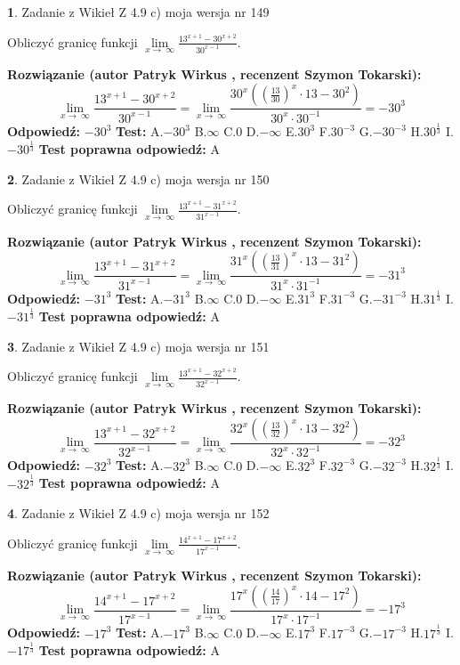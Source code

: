 \documentclass[12pt, a4paper]{article}
\theoremstyle{definition} %
\newtheorem{zad}{}
\newcommand{\zadStart}[1]{\begin{zad}#1\newline}
\newcommand{\zadStop}{\end{zad}}
\newcommand{\rozwStart}[2]{\noindent \textbf{Rozwiązanie (autor #1 , recenzent #2): }\newline}
\newcommand{\rozwStop}{\newline}
\newcommand{\odpStart}{\noindent \textbf{Odpowiedź:}\newline}
\newcommand{\odpStop}{\newline}
\newcommand{\testStart}{\noindent \textbf{Test:}\newline}
\newcommand{\testStop}{\newline}
\newcommand{\kluczStart}{\noindent \textbf{Test poprawna odpowiedź:}\newline}
\newcommand{\kluczStop}{\newline}
\begin{document}
\zadStart{Zadanie z Wikieł Z 4.9 c) moja wersja nr 149}


Obliczyć granicę funkcji  $\lim\limits_{x\to\ \infty}\frac{13^{x+1}-30^{x+2}}{30^{x-1}}$.
\zadStop
\rozwStart{Patryk Wirkus}{Szymon Tokarski}
$$\lim\limits_{x\to\ \infty}\frac{13^{x+1}-30^{x+2}}{30^{x-1}}=\lim\limits_{x\to\ \infty}\frac{30^{x}((\frac{13}{30})^{x}\cdot 13 -30^{2})}{30^{x}\cdot 30^{-1}} = -30^{3}$$
\rozwStop
\odpStart
$-30^{3}$
\odpStop
\testStart
A.$-30^{3}$ B.$\infty$ C.$0$ D.$-\infty$ E.$30^{3}$
F.$30^{-3}$ G.$-30^{-3}$
H.$30^{\frac{1}{3}}$
I.$-30^{\frac{1}{3}}$
\testStop
\kluczStart
A
\kluczStop



\zadStart{Zadanie z Wikieł Z 4.9 c) moja wersja nr 150}


Obliczyć granicę funkcji  $\lim\limits_{x\to\ \infty}\frac{13^{x+1}-31^{x+2}}{31^{x-1}}$.
\zadStop
\rozwStart{Patryk Wirkus}{Szymon Tokarski}
$$\lim\limits_{x\to\ \infty}\frac{13^{x+1}-31^{x+2}}{31^{x-1}}=\lim\limits_{x\to\ \infty}\frac{31^{x}((\frac{13}{31})^{x}\cdot 13 -31^{2})}{31^{x}\cdot 31^{-1}} = -31^{3}$$
\rozwStop
\odpStart
$-31^{3}$
\odpStop
\testStart
A.$-31^{3}$ B.$\infty$ C.$0$ D.$-\infty$ E.$31^{3}$
F.$31^{-3}$ G.$-31^{-3}$
H.$31^{\frac{1}{3}}$
I.$-31^{\frac{1}{3}}$
\testStop
\kluczStart
A
\kluczStop



\zadStart{Zadanie z Wikieł Z 4.9 c) moja wersja nr 151}


Obliczyć granicę funkcji  $\lim\limits_{x\to\ \infty}\frac{13^{x+1}-32^{x+2}}{32^{x-1}}$.
\zadStop
\rozwStart{Patryk Wirkus}{Szymon Tokarski}
$$\lim\limits_{x\to\ \infty}\frac{13^{x+1}-32^{x+2}}{32^{x-1}}=\lim\limits_{x\to\ \infty}\frac{32^{x}((\frac{13}{32})^{x}\cdot 13 -32^{2})}{32^{x}\cdot 32^{-1}} = -32^{3}$$
\rozwStop
\odpStart
$-32^{3}$
\odpStop
\testStart
A.$-32^{3}$ B.$\infty$ C.$0$ D.$-\infty$ E.$32^{3}$
F.$32^{-3}$ G.$-32^{-3}$
H.$32^{\frac{1}{3}}$
I.$-32^{\frac{1}{3}}$
\testStop
\kluczStart
A
\kluczStop



\zadStart{Zadanie z Wikieł Z 4.9 c) moja wersja nr 152}


Obliczyć granicę funkcji  $\lim\limits_{x\to\ \infty}\frac{14^{x+1}-17^{x+2}}{17^{x-1}}$.
\zadStop
\rozwStart{Patryk Wirkus}{Szymon Tokarski}
$$\lim\limits_{x\to\ \infty}\frac{14^{x+1}-17^{x+2}}{17^{x-1}}=\lim\limits_{x\to\ \infty}\frac{17^{x}((\frac{14}{17})^{x}\cdot 14 -17^{2})}{17^{x}\cdot 17^{-1}} = -17^{3}$$
\rozwStop
\odpStart
$-17^{3}$
\odpStop
\testStart
A.$-17^{3}$ B.$\infty$ C.$0$ D.$-\infty$ E.$17^{3}$
F.$17^{-3}$ G.$-17^{-3}$
H.$17^{\frac{1}{3}}$
I.$-17^{\frac{1}{3}}$
\testStop
\kluczStart
A
\kluczStop
\end{document}
